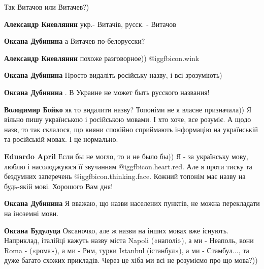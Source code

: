  
 
 
 
 
\zzSecCmt

\begin{itemize} %
Так Витачов или Витачев?)

\begin{itemize} %
\textbf{Александр Киевлянин} укр.- Витачів,
русск. - Витачов

\begin{itemize} %
\textbf{Оксана Дубинина} а Витачев по-белорусски?

\textbf{Александр Киевлянин} похоже разговорное)) @igg{fbicon.wink} 

\textbf{Оксана Дубинина} Просто видаліть російську назву, і всі зрозуміють)

\textbf{Оксана Дубинина} . В Украине не может быть русского названия!

\textbf{Володимир Бойко}
як то видалити назву?
Топоніми не я власне призначала))
Я вільно пишу українською і російською мовами. І хто хоче, все розуміє.
А щодо назв, то так склалося, що кияни спокійно сприймають інформацію на українській та російській мовах.
І це нормально.

\textbf{Eduardo April} Если бы не могло, то и не было бы))
Я - за українську мову, люблю і насолоджуюся її звучанням @igg{fbicon.heart.red}.
Але я проти тиску та бездумних заперечень @igg{fbicon.thinking.face}.
Кожний топонім має назву на будь-якій мові.
Хорошого Вам дня!

\textbf{Оксана Дубинина} Я вважаю, що назви населених пунктів, не можна перекладати на іноземні мови.

\textbf{Оксана Будулуца} Оксаночко, але ж назви на інших мовах вже існують.
Наприклад, італійці кажуть назву міста Napoli («наполі»), а ми - Неаполь, вони Roma - («рома»), а ми - Рим, турки Istanbul (істанбул»), а ми - Стамбул..., та дуже багато схожих прикладів.
Через це хіба ми всі не розуміємо про що мова?))
\end{itemize} %


\end{itemize}
\end{itemize}
